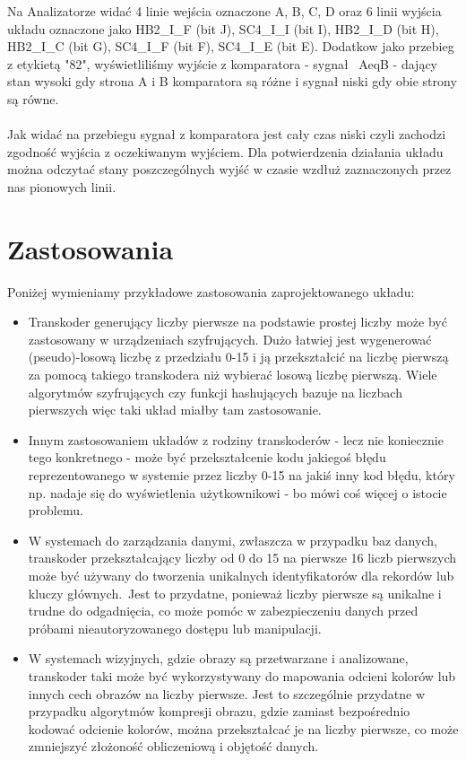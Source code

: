 \documentclass[a4paper]{article}
\begin{document}
Na Analizatorze widać 4 linie wejścia oznaczone A, B, C, D oraz 6 linii wyjścia układu oznaczone jako HB2\_I\_F (bit J), SC4\_I\_I (bit I), HB2\_I\_D (bit H), HB2\_I\_C (bit G), SC4\_I\_F (bit F), SC4\_I\_E (bit E). Dodatkow jako przebieg
z etykietą "82", wyświetliliśmy wyjście z komparatora - sygnał ~AeqB - dający stan wysoki gdy strona A i B komparatora są różne i sygnał niski
gdy obie strony są równe.\\
\\
Jak widać na przebiegu sygnał z komparatora jest cały czas niski czyli zachodzi zgodność wyjścia z oczekiwanym wyjściem. Dla potwierdzenia działania układu
można odczytać stany poszczególnych wyjść w czasie wzdłuż zaznaczonych przez nas pionowych linii.


\section{Zastosowania}
Poniżej wymieniamy przykładowe zastosowania zaprojektowanego układu:
\begin{itemize}
  \item Transkoder generujący liczby pierwsze na podstawie prostej liczby może być zastosowany w urządzeniach 
      szyfrujących. Dużo łatwiej jest wygenerować (pseudo)-losową liczbę z przedziału 0-15 i ją przekształcić na
      liczbę pierwszą za pomocą takiego transkodera niż wybierać losową liczbę pierwszą. Wiele algorytmów szyfrujących
      czy funkcji hashujących bazuje na liczbach pierwszych więc taki układ miałby tam zastosowanie.
  \item Innym zastosowaniem układów z rodziny transkoderów - lecz nie koniecznie tego konkretnego - może być 
      przekształcenie kodu jakiegoś błędu reprezentowanego w systemie przez liczby 0-15 na jakiś inny kod błędu, 
      który np. nadaje się do wyświetlenia użytkownikowi - bo mówi coś więcej o istocie problemu.
  \item W systemach do zarządzania danymi, zwłaszcza w przypadku baz danych,
      transkoder przekształcający liczby od 0 do 15 na pierwsze 16 liczb pierwszych może być
      używany do tworzenia unikalnych identyfikatorów dla rekordów lub kluczy głównych.\
      Jest to przydatne, ponieważ liczby pierwsze są unikalne i trudne do odgadnięcia,
      co może pomóc w zabezpieczeniu danych przed próbami nieautoryzowanego dostępu lub manipulacji.

  \item W systemach wizyjnych, gdzie obrazy są przetwarzane i analizowane,
   transkoder taki może być wykorzystywany do mapowania odcieni kolorów lub innych cech obrazów na liczby pierwsze.
    Jest to szczególnie przydatne w przypadku algorytmów kompresji obrazu,
     gdzie zamiast bezpośrednio kodować odcienie kolorów, można przekształcać je na liczby pierwsze,
      co może zmniejszyć złożoność obliczeniową i objętość danych.
\end{itemize}
\pagebreak
\end{document}
